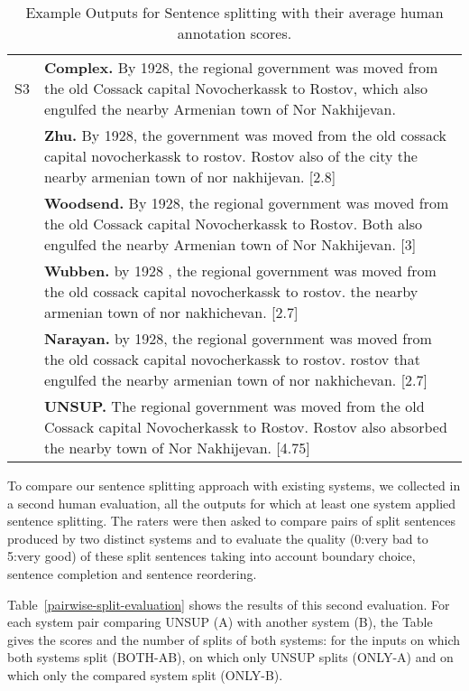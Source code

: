 \documentclass[11pt,a4paper]{article}
\begin{document}
\begin{table*}[htbp]
\begin{footnotesize}
\begin{tabular}{|l|p{15cm}|}
      S3 &  {\bf Complex.} By 1928, the regional government was moved from the old
      Cossack capital Novocherkassk to Rostov, which also engulfed the
      nearby Armenian town of Nor Nakhijevan. \\
      &  {\bf Zhu.} By 1928, the government was moved from the old cossack
      capital novocherkassk to rostov. Rostov also of the city the nearby
      armenian town of nor nakhijevan. [2.8]\\
      & {\bf Woodsend.} By 1928, the regional government was moved from the
      old Cossack capital Novocherkassk to Rostov. Both also engulfed the
      nearby Armenian town of Nor Nakhijevan. [3]\\
      & {\bf Wubben.} by 1928 , the regional government was moved from the
      old cossack capital novocherkassk to rostov. the nearby armenian
      town of nor nakhichevan. [2.7]\\
      & {\bf Narayan.} by 1928, the regional government was moved from the
      old cossack capital novocherkassk to rostov. rostov that engulfed
      the nearby armenian town of nor nakhichevan. [2.7]\\
      &  {\bf UNSUP.} The regional government was moved from the old Cossack
      capital Novocherkassk to Rostov. Rostov also absorbed the nearby
      town of Nor Nakhijevan. [4.75]
      \\\hline
\end{tabular}
  \end{footnotesize}
  \caption{\small Example Outputs for  Sentence splitting with their
    average human annotation scores.}\label{fig:splits}
  \vspace{-0.4cm}
\end{table*}


To compare our sentence splitting approach with existing systems, we
collected in a second human evaluation, all the outputs for which at
least one system applied sentence splitting. The raters were then
asked to compare pairs of split sentences produced by two distinct
systems and to evaluate the quality (0:very bad to 5:very good) of
these split sentences taking into account boundary choice, sentence
completion and sentence reordering. 

Table~\ref{pairwise-split-evaluation} shows the results of this second
evaluation. For each system pair comparing UNSUP (A) with another system (B),
the Table gives the scores and the number of splits of both systems:
for the inputs on which both systems split (BOTH-AB), on which only
UNSUP splits (ONLY-A) and on which only the compared system split
(ONLY-B).
\end{document}

